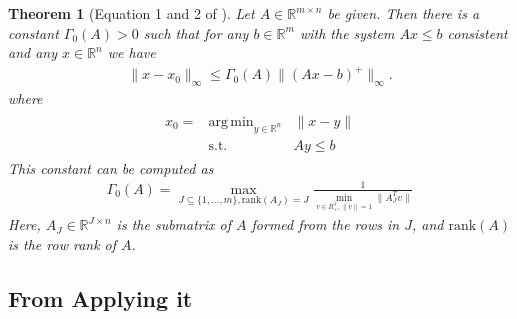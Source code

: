 \documentclass{article}
\newtheorem{theorem}{Theorem}[section]
\newtheorem{lemma}[theorem]{Lemma}
\theoremstyle{case}
\numberwithin{theorem}{subsection}
\DeclareMathOperator*{\argmin}{arg\,min}
\newcommand{\huff}{{\Gamma_0}}
\newcommand{\Rm}{\mathbb R^m}
\newcommand{\Rn}{\mathbb R^n}
\begin{document}
\begin{theorem}[Equation 1 and 2 of \cite{pena2018algorithm}]
\label{hoffman}
Let $A \in \mathbb R^{m \times n}$ be given.
Then there is a constant $\huff(A) > 0$ such that for any $b \in \Rm$ with the system $Ax \le b$ consistent and any $x \in \Rn$ we have
\begin{align*}
\|x - x_0\|_{\infty} \le \huff(A) \|(Ax - b)^+\|_\infty.
\end{align*}
where
\begin{align*}
\begin{array}{ccc}
x_0 = & \argmin_{y \in \Rn} & \|x - y\| \\
      & \textrm{s.t.}    & Ay \le b
\end{array}
\end{align*}
This constant can be computed as
\begin{align*}
\huff(A) = \max_{J \subseteq \{1,\ldots,m\}, \textrm{rank}(A_J) = J} \frac 1 {\min_{v \in R^J_{+}, \|v\| = 1} \|A_J^Tv\|}
\end{align*}
Here, $A_J \in \mathbb R^{J \times n}$ is the submatrix of $A$ formed from the rows in $J$, and $\textrm{rank}(A)$ is the row rank of $A$.
\end{theorem}

\color{black}


% 




\subsection{From Applying it}
\end{document}
